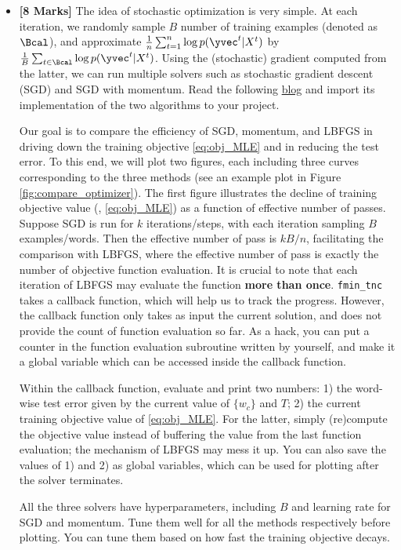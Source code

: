 \documentclass[11pt]{report}
\begin{document}
%
\begin{itemize}
	\item[(4a)] {\bf [8 Marks]}
	 The idea of stochastic optimization is very simple. 
	At each iteration, we randomly sample $B$ number of training examples (denoted as $\Bcal$), 
	and approximate $\frac{1}{n}\sum_{t=1}^n \log p(\yvec^t | X^t)$
	by $\frac{1}{B}\sum_{t\in \Bcal} \log p(\yvec^t | X^t)$.
	Using the (stochastic) gradient computed from the latter, 
	we can run multiple solvers such as stochastic gradient descent (SGD)
	and SGD with momentum.
	Read the following \href{https://machinelearningmastery.com/gradient-descent-with-momentum-from-scratch/}{blog} and import its implementation of the two algorithms to your project.
	
	
	Our goal is to compare the efficiency of SGD, momentum, and LBFGS in driving down the training objective \eqref{eq:obj_MLE} and in reducing the test error.
	To this end, we will plot two figures, each including three curves corresponding to the  three methods (see an example plot in Figure \ref{fig:compare_optimizer}).
	The first figure illustrates the decline of training objective value (\ie, \eqref{eq:obj_MLE}) as a function of effective number of passes.
	Suppose SGD is run for $k$ iterations/steps, with each iteration sampling $B$ examples/words.
	Then the effective number of pass is $kB/n$,
	facilitating the comparison with LBFGS,
	where the effective number of pass is exactly the number of objective function evaluation.
	It is crucial to note that each iteration of LBFGS may evaluate the function \textbf{more than once}.
	\verb#fmin_tnc# takes a callback function, which will help us to track the progress.
	However, the callback function only takes as input the current solution,
	and does not provide the count of function evaluation so far.
	As a hack, you can put a counter in the function evaluation subroutine written by yourself,
	and make it a global variable which can be accessed inside the callback function.
	
	Within the callback function, evaluate and print two numbers: 
	1) the word-wise test error given by the current value of $\{w_c\}$ and $T$;
	2) the current training objective value of \eqref{eq:obj_MLE}.
	For the latter, simply (re)compute the objective value instead of buffering the value from the last function evaluation; the mechanism of LBFGS may mess it up.
	You can also save the values of 1) and 2) as global variables,
	which can be used for plotting after the solver terminates.
	 
	All the three solvers have hyperparameters, including $B$ and learning rate for SGD and momentum.
	Tune them well for all the methods respectively before plotting.
	You can tune them based on how fast the training objective decays.
	

\end{itemize}
\end{document}
